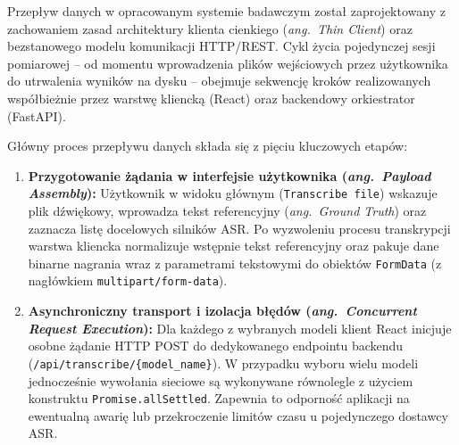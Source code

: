 \label{subsubsec:data_flow}

Przepływ danych w opracowanym systemie badawczym został zaprojektowany z zachowaniem zasad architektury klienta cienkiego (\textit{ang.~Thin Client}) oraz bezstanowego modelu komunikacji HTTP/REST. Cykl życia pojedynczej sesji pomiarowej – od momentu wprowadzenia plików wejściowych przez użytkownika do utrwalenia wyników na dysku – obejmuje sekwencję kroków realizowanych współbieżnie przez warstwę kliencką (React) oraz backendowy orkiestrator (FastAPI).

Główny proces przepływu danych składa się z pięciu kluczowych etapów:

\begin{enumerate}
    \item \textbf{Przygotowanie żądania w interfejsie użytkownika (\textit{ang.~Payload Assembly}):}
    Użytkownik w widoku głównym (\texttt{Transcribe file}) wskazuje plik dźwiękowy, wprowadza tekst referencyjny (\textit{ang.~Ground Truth}) oraz zaznacza listę docelowych silników ASR. Po wyzwoleniu procesu transkrypcji warstwa kliencka normalizuje wstępnie tekst referencyjny oraz pakuje dane binarne nagrania wraz z parametrami tekstowymi do obiektów \texttt{FormData} (z nagłówkiem \texttt{multipart/form-data}).

    \item \textbf{Asynchroniczny transport i izolacja błędów (\textit{ang.~Concurrent Request Execution}):}
    Dla każdego z wybranych modeli klient React inicjuje osobne żądanie HTTP POST do dedykowanego endpointu backendu (\texttt{/api/transcribe/\{model\_name\}}). W przypadku wyboru wielu modeli jednocześnie wywołania sieciowe są wykonywane równolegle z użyciem konstruktu \texttt{Promise.allSettled}. Zapewnia to odporność aplikacji na ewentualną awarię lub przekroczenie limitów czasu u pojedynczego dostawcy ASR.


\end{enumerate}

